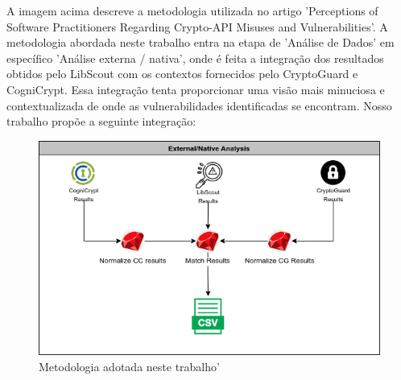 A imagem acima descreve a metodologia utilizada no artigo 'Perceptions of Software Practitioners Regarding Crypto-API Misuses and Vulnerabilities'. A metodologia abordada neste trabalho entra na etapa de 'Análise de Dados' em específico 'Análise externa / nativa', onde é feita a integração dos resultados obtidos pelo LibScout com os contextos fornecidos pelo CryptoGuard e CogniCrypt. Essa integração tenta proporcionar uma visão mais minuciosa e contextualizada de onde as vulnerabilidades identificadas se encontram.
Nosso trabalho propõe a seguinte integração:

\begin{figure}[!h]
  \centering
  \includegraphics[scale=0.5]{img/studySettingsExternal.png}
  \caption{Metodologia adotada neste trabalho'}
  \label{averageWarnings}
\end{figure}


